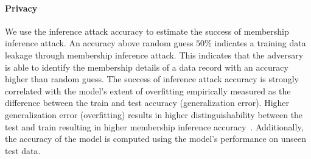 \paragraph{Privacy}
We use the inference attack accuracy to estimate the success of membership inference attack.
An accuracy above random guess $50\%$ indicates a training data leakage through membership inference attack.
This indicates that the adversary is able to identify the membership details of a data record with an accuracy higher than random guess.
The success of inference attack accuracy is strongly correlated with the model's extent of overfitting empirically measured as the difference between the train and test accuracy (generalization error). Higher generalization error (overfitting) results in higher distinguishability between the test and train resulting in higher membership inference accuracy~\cite{shokri2017membership}.
Additionally, the accuracy of the model is computed using the model's performance on unseen test data.
